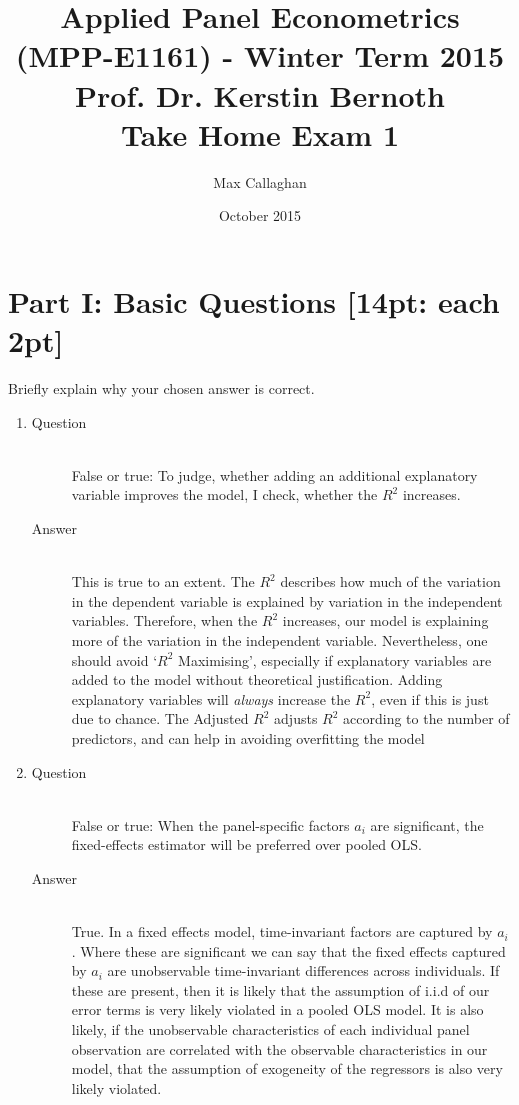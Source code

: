 \documentclass{article}
\begin{document}
\title{\small Applied Panel Econometrics (MPP-E1161) - Winter Term 2015 \\ Prof. Dr. Kerstin Bernoth \\ \bigskip \Large Take Home Exam 1}
\author{Max Callaghan}
\date{October 2015}
\maketitle

\section{Part I: Basic Questions [14pt: each 2pt]}
Briefly explain why your chosen answer is correct.
\begin{enumerate}
  \item
  \begin{description}
    \item[Question] \hfill \\
    False or true: To judge, whether adding an additional explanatory variable improves the model, I check, whether the $R^{2}$ increases.
    \item[Answer] \hfill \\
    This is true to an extent. The $R^2$ describes how much of the variation in the dependent variable is explained by variation in the independent variables. Therefore, when the $R^2$ increases, our model is explaining more of the variation in the independent variable. Nevertheless, one should avoid `$R^2$ Maximising', especially if explanatory variables are added to the model without theoretical justification. Adding explanatory variables will \textit{always} increase the $R^2$, even if this is just due to chance. The Adjusted $R^2$ adjusts $R^2$ according to the number of predictors, and can help in avoiding overfitting the model
  \end{description}
  
  \item
  \begin{description}
    \item[Question] \hfill \\
    False or true: When the panel-specific factors $a_i$ are significant, the fixed-effects estimator will be preferred over pooled OLS.
    \item[Answer] \hfill \\
    True. In a fixed effects model, time-invariant factors are captured by $a_i$. Where these are significant we can say that the fixed effects captured by $a_i$ are unobservable time-invariant differences across individuals. If these are present, then it is likely that the assumption of i.i.d of our error terms is very likely violated in a pooled OLS model. It is also likely, if the unobservable characteristics of each individual panel observation are correlated with the observable characteristics in our model, that the assumption of exogeneity of the regressors is also very likely violated.
  \end{description}
  

\end{enumerate}
\end{document}
